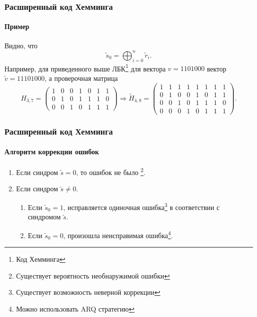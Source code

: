 \begin{frame}
    \frametitle{Расширенный код Хемминга}
    \framesubtitle{Пример}
    
    Видно, что \[ \tilde{s}_0=\bigoplus_{i=0}^{n}\tilde{r}_i. \]
    Например, для приведенного выше ЛБК\footnote{Код Хемминга} для вектора $v=1101000$ вектор $\tilde{v}=11101000$, а проверочная матрица
    \[
        H_{3,7} = 
            \begin{pmatrix}
                1&0&0&1&0&1&1\\
                0&1&0&1&1&1&0\\
                0&0&1&0&1&1&1
            \end{pmatrix}
        \Rightarrow
        \tilde{H}_{4,8} = 
            \begin{pmatrix}
                1&1&1&1&1&1&1&1\\
                0&1&0&0&1&0&1&1\\
                0&0&1&0&1&1&1&0\\
                0&0&0&1&0&1&1&1
            \end{pmatrix}.
    \]
\end{frame}


\begin{frame}
    \frametitle{Расширенный код Хемминга}
    \framesubtitle{Алгоритм коррекции ошибок}

    \begin{enumerate}
        \item Если синдром $\tilde{s}=0$, то ошибок не было
            \footnote{Существует вероятность необнаружимой ошибки}.
        \item Если синдром $\tilde{s}\neq 0$.
        \begin{enumerate}
            \item Если $\tilde{s}_0=1$, исправляется одиночная ошибка\footnote{Существует возможность неверной коррекции} в соответствии с синдромом $\tilde{s}$.
            \item Если $\tilde{s}_0=0$, произошла неисправимая ошибка\footnote{Можно использовать ARQ стратегию}.
        \end{enumerate}
    \end{enumerate}
\end{frame}


